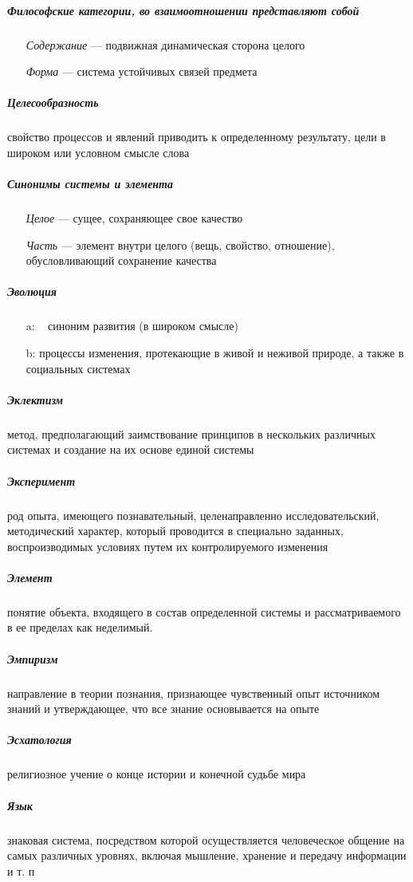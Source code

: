 \documentclass[a4paper, 12pt]{article}
\theoremstyle{plain} %
\theoremstyle{definition} %
\theoremstyle{remark} %
\begin{document}
\subparagraph{Философские категории, во взаимоотношении представляют собой}
\begin{itemize}
	\item[] \emph{Содержание} --- подвижная динамическая сторона целого
	\item[] \emph{Форма} ---  система устойчивых связей предмета
\end{itemize}

\subparagraph{Целесообразность}
	свойство процессов и явлений приводить к определенному результату, цели в широком или условном смысле слова

\subparagraph{Синонимы системы и элемента}
\begin{itemize}
	\item[] \emph{Целое} --- сущее, сохраняющее свое качество
	\item[] \emph{Часть} ---  элемент внутри целого (вещь, свойство, отношение), обусловливающий сохранение качества
\end{itemize}

\subparagraph{Эволюция}
\begin{itemize}
	\item[a:] ~ синоним развития (в широком смысле)
	\item[b:] процессы изменения, протекающие в живой и неживой природе, а также в социальных системах
\end{itemize}

\subparagraph{Эклектизм}
	 метод, предполагающий заимствование принципов в нескольких различных системах и создание на их основе единой системы

\subparagraph{Эксперимент}
	род опыта, имеющего познавательный, целенаправленно исследовательский, методический характер, который проводится в специально заданных, воспроизводимых условиях путем их контролируемого изменения

\subparagraph{Элемент}
	понятие объекта, входящего в состав определенной системы и рассматриваемого в ее пределах как неделимый.

\subparagraph{Эмпиризм}
	 направление в теории познания, признающее чувственный опыт источником знаний и утверждающее, что все знание основывается на опыте

\subparagraph{Эсхатология}
	религиозное учение о конце истории и конечной судьбе мира

\subparagraph{Язык}
знаковая система, посредством которой осуществляется человеческое общение на самых различных уровнях, включая мышление, хранение и передачу информации и т. п
\end{document}
